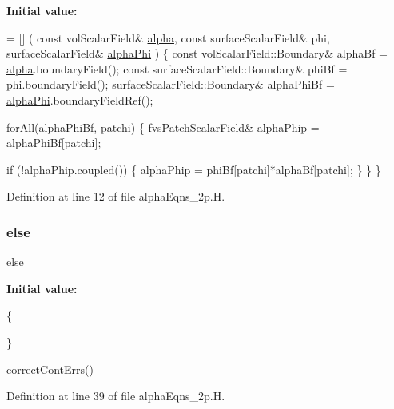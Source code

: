 {\bfseries Initial value\+:}
\begin{DoxyCode}
= []
    (
        \textcolor{keyword}{const} volScalarField& \hyperlink{UEqn__1p_8H_a7fe02434a19f3e00e927f32adcbb193b}{alpha},
        \textcolor{keyword}{const} surfaceScalarField& phi,
        surfaceScalarField& \hyperlink{updateAlphaPhiAndInitControls__1p_8H_ad9f7b6a8430600697bc27662b63bb184}{alphaPhi}
    )
    \{
        \textcolor{keyword}{const} volScalarField::Boundary& alphaBf = \hyperlink{UEqn__1p_8H_a7fe02434a19f3e00e927f32adcbb193b}{alpha}.boundaryField();
        \textcolor{keyword}{const} surfaceScalarField::Boundary& phiBf = phi.boundaryField();
        surfaceScalarField::Boundary& alphaPhiBf = \hyperlink{updateAlphaPhiAndInitControls__1p_8H_ad9f7b6a8430600697bc27662b63bb184}{alphaPhi}.boundaryFieldRef();

        \hyperlink{calcScatteringSourceAdjoint_8H_a56c25250273deb5895931907a55f269c}{forAll}(alphaPhiBf, patchi)
        \{
            fvsPatchScalarField& alphaPhip = alphaPhiBf[patchi];

            \textcolor{keywordflow}{if} (!alphaPhip.coupled())
            \{
                alphaPhip = phiBf[patchi]*alphaBf[patchi];
            \}
        \}
    \}
\end{DoxyCode}


Definition at line 12 of file alpha\+Eqns\+\_\+2p.\+H.

\mbox{\label{alphaEqns__2p_8H_a0544c3fe466e421738dae463968b70ba}} 
\subsubsection{\texorpdfstring{else}{else}}
{\footnotesize\ttfamily else}

{\bfseries Initial value\+:}
\begin{DoxyCode}
\{

    \}
    
    correctContErrs()
\end{DoxyCode}


Definition at line 39 of file alpha\+Eqns\+\_\+2p.\+H.

